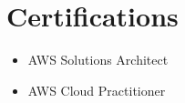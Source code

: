 \documentclass[letterpaper,11pt]{article}
\newcommand{\resumeSubHeadingListStart}{\begin{itemize}[leftmargin=0.0in, label={}]}
\begin{document}
\vspace{-5pt}
  \section{Certifications}
        \begin{multicols}{3}
            \begin{itemize}[itemsep=-5pt, parsep=5pt]
              \item AWS Solutions Architect
              \item AWS Cloud Practitioner
            \end{itemize}
        \end{multicols}
\vspace*{2.0\multicolsep}


\vspace{-5pt}
\end{document}
